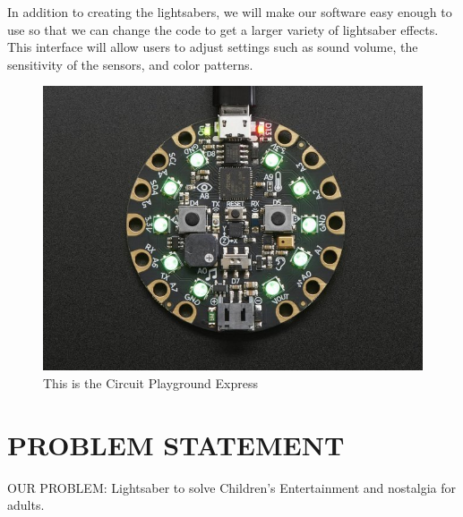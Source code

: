 \documentclass[12pt]{article}
\begin{document}
In addition to creating the lightsabers, we will make our software easy enough to use so that we can change the code to get a larger variety of lightsaber effects. This interface will allow users to adjust settings such as sound volume, the sensitivity of the sensors, and color patterns.


\begin{figure}[!t]
\centering
\includegraphics[width=4.5in]{cpx01.jpg}
\caption{This is the Circuit Playground Express}
\label{fig:cpx}
\end{figure}

\section{PROBLEM STATEMENT}

OUR PROBLEM: Lightsaber to solve Children's Entertainment and nostalgia for adults.


\end{document}
